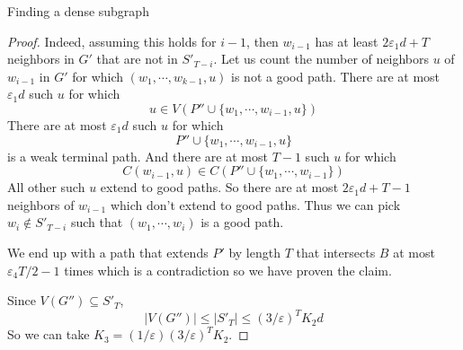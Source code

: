 \documentclass[11pt,a4paper]{article}
\newcommand{\vep}{\varepsilon}
\begin{document}
\begin{section}{Finding a dense subgraph}
\begin{proof}
\medskip

Indeed, assuming this holds for $i -1$, then $w_{i-1}$ has at least $2 \vep_1 d + T$ neighbors in $G'$ that are not in $S'_{T - i}$. Let us count the number of neighbors $u$ of $w_{i - 1}$ in $G'$ for which $(w_1, \cdots, w_{k - 1}, u)$ is not a good path. There are at most $\vep_1 d$ such $u$ for which
\[
u \in V( P'' \cup \{w_1, \cdots, w_{i - 1}, u \})
\]
There are at most $\vep_1 d$ such $u$ for which
\[
P'' \cup \{w_1, \cdots, w_{i - 1}, u \}
\]
is a weak terminal path. And there are at most $T - 1$ such $u$ for which
\[
C(w_{i - 1}, u) \in C(P'' \cup \{w_1, \cdots, w_{i - 1} \})
\]
All other such $u$ extend to good paths. So there are at most $2 \vep_1 d + T - 1$ neighbors of $w_{i -1}$ which don't extend to good paths. Thus we can pick $w_i \not \in S'_{T - i}$ such that $(w_1, \cdots, w_i)$ is a good path.

\medskip

We end up with a path that extends $P'$ by length $T$ that intersects $B$ at most $\vep_4 T/2 - 1$ times which is a contradiction so we have proven the claim.

\bigskip

Since $V(G'') \subseteq S'_T$,
\[
|V(G'') | \leq |S'_T| \leq (3/\vep)^T K_2 d
\]
So we can take $K_3 = (1/\vep) (3/\vep)^T K_2$.
\end{proof}
\end{section}
\end{document}
